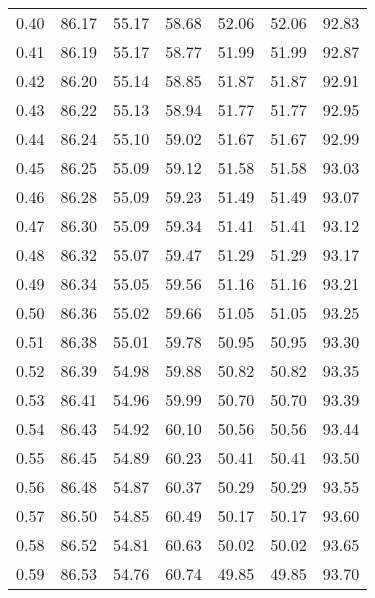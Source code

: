 \begin{tabular}{|c|c|c|c|c|c|c|}
      0.40 &     86.17 &     55.17 &      58.68 &   52.06 &      52.06 &         92.83 \\
      0.41 &     86.19 &     55.17 &      58.77 &   51.99 &      51.99 &         92.87 \\
      0.42 &     86.20 &     55.14 &      58.85 &   51.87 &      51.87 &         92.91 \\
      0.43 &     86.22 &     55.13 &      58.94 &   51.77 &      51.77 &         92.95 \\
      0.44 &     86.24 &     55.10 &      59.02 &   51.67 &      51.67 &         92.99 \\
      0.45 &     86.25 &     55.09 &      59.12 &   51.58 &      51.58 &         93.03 \\
      0.46 &     86.28 &     55.09 &      59.23 &   51.49 &      51.49 &         93.07 \\
      0.47 &     86.30 &     55.09 &      59.34 &   51.41 &      51.41 &         93.12 \\
      0.48 &     86.32 &     55.07 &      59.47 &   51.29 &      51.29 &         93.17 \\
      0.49 &     86.34 &     55.05 &      59.56 &   51.16 &      51.16 &         93.21 \\
      0.50 &     86.36 &     55.02 &      59.66 &   51.05 &      51.05 &         93.25 \\
      0.51 &     86.38 &     55.01 &      59.78 &   50.95 &      50.95 &         93.30 \\
      0.52 &     86.39 &     54.98 &      59.88 &   50.82 &      50.82 &         93.35 \\
      0.53 &     86.41 &     54.96 &      59.99 &   50.70 &      50.70 &         93.39 \\
      0.54 &     86.43 &     54.92 &      60.10 &   50.56 &      50.56 &         93.44 \\
      0.55 &     86.45 &     54.89 &      60.23 &   50.41 &      50.41 &         93.50 \\
      0.56 &     86.48 &     54.87 &      60.37 &   50.29 &      50.29 &         93.55 \\
      0.57 &     86.50 &     54.85 &      60.49 &   50.17 &      50.17 &         93.60 \\
      0.58 &     86.52 &     54.81 &      60.63 &   50.02 &      50.02 &         93.65 \\
      0.59 &     86.53 &     54.76 &      60.74 &   49.85 &      49.85 &         93.70 \\

\end{tabular}
